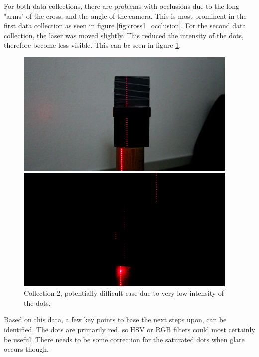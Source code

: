 For both data collections, there are problems with occlusions due to the long "arms" of the cross, and the angle of the camera. This is most prominent in the first data collection as seen in figure \ref{fig:cross1_occlusion}. For the second data collection, the laser was moved slightly. This reduced the intensity of the dots, therefore become less visible. This can be seen in figure \ref{fig:cross2_low_light}. 
\begin{figure}[h!]
    \centering
    \begin{minipage}[t]{0.48\textwidth}
        \centering
        \includegraphics[width=0.95\textwidth]{figures/ImageAnalysis/cross1_occlusion.png}
        \caption{Collection 1, potentially difficult case due to occlusion.}
    \label{fig:cross1_occlusion}

    \end{minipage}%
    \hspace{.03\textwidth}
    \begin{minipage}[t]{0.48\textwidth}
        \centering
        \includegraphics[width=0.95\textwidth]{figures/ImageAnalysis/cross2_low_light.png}
        \caption{Collection 2, potentially difficult case due to very low intensity of the dots.}
        \label{fig:cross2_low_light}
    \end{minipage}
\end{figure}
\FloatBarrier
Based on this data, a few key points to base the next steps upon, can be identified. The dots are primarily red, so HSV or RGB filters could most certainly be useful. There needs to be some correction for the saturated dots when glare occurs though. 

